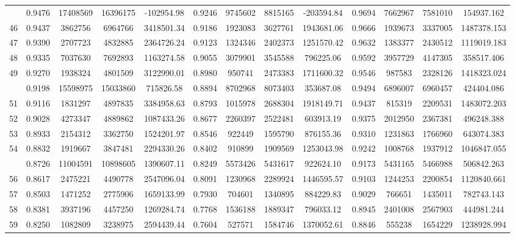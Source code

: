 \documentclass[
  12pt,
]{article}
\begin{document}
\begin{longtable}[t]{lcccccccccccc}
\addlinespace
45 & 0.9476 & 17408569 & 16396175 & -102954.98 & 0.9246 & 9745602 & 8815165 & -203594.84 & 0.9694 & 7662967 & 7581010 & 154937.162\\
46 & 0.9437 & 3862756 & 6964766 & 3418501.34 & 0.9186 & 1923083 & 3627761 & 1943681.06 & 0.9666 & 1939673 & 3337005 & 1487378.153\\
47 & 0.9390 & 2707723 & 4832885 & 2364726.24 & 0.9123 & 1324346 & 2402373 & 1251570.42 & 0.9632 & 1383377 & 2430512 & 1119019.183\\
48 & 0.9335 & 7037630 & 7692893 & 1163274.58 & 0.9055 & 3079901 & 3545588 & 796225.06 & 0.9592 & 3957729 & 4147305 & 358517.406\\
49 & 0.9270 & 1938324 & 4801509 & 3122990.01 & 0.8980 & 950741 & 2473383 & 1711600.32 & 0.9546 & 987583 & 2328126 & 1418323.024\\
\addlinespace
50 & 0.9198 & 15598975 & 15033860 & 715826.58 & 0.8894 & 8702968 & 8073403 & 353687.08 & 0.9494 & 6896007 & 6960457 & 424404.086\\
51 & 0.9116 & 1831297 & 4897835 & 3384958.63 & 0.8793 & 1015978 & 2688304 & 1918149.71 & 0.9437 & 815319 & 2209531 & 1483072.203\\
52 & 0.9028 & 4273347 & 4889862 & 1087433.26 & 0.8677 & 2260397 & 2522481 & 603913.19 & 0.9375 & 2012950 & 2367381 & 496248.388\\
53 & 0.8933 & 2154312 & 3362750 & 1524201.97 & 0.8546 & 922449 & 1595790 & 876155.36 & 0.9310 & 1231863 & 1766960 & 643074.383\\
54 & 0.8832 & 1919667 & 3847481 & 2294330.26 & 0.8402 & 910899 & 1909569 & 1253043.98 & 0.9242 & 1008768 & 1937912 & 1046847.055\\
\addlinespace
55 & 0.8726 & 11004591 & 10898605 & 1390607.11 & 0.8249 & 5573426 & 5431617 & 922624.10 & 0.9173 & 5431165 & 5466988 & 506842.263\\
56 & 0.8617 & 2475221 & 4490778 & 2547096.04 & 0.8091 & 1230968 & 2289924 & 1446595.57 & 0.9103 & 1244253 & 2200854 & 1120840.661\\
57 & 0.8503 & 1471252 & 2775906 & 1659133.99 & 0.7930 & 704601 & 1340895 & 884229.83 & 0.9029 & 766651 & 1435011 & 782743.143\\
58 & 0.8381 & 3937196 & 4457250 & 1269284.74 & 0.7768 & 1536188 & 1889347 & 796033.12 & 0.8945 & 2401008 & 2567903 & 444981.244\\
59 & 0.8250 & 1082809 & 3238975 & 2594439.44 & 0.7604 & 527571 & 1584746 & 1370052.61 & 0.8846 & 555238 & 1654229 & 1238928.994\\

\end{longtable}
\end{document}
